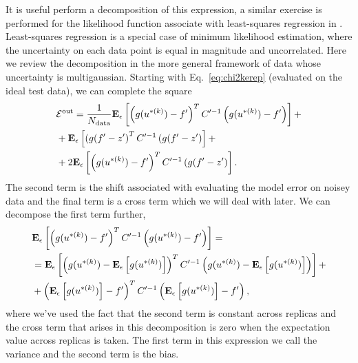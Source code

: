 It is useful perform a decomposition of this expression, a similar exercise
is performed for the likelihood function associate with least-squares
regression in \cite{mlforphysics}. Least-squares
regression is a special case of minimum likelihood estimation, where the
uncertainty on each data point is equal in magnitude and uncorrelated. Here
we review the decomposition in the more general framework of data whose
uncertainty is multigaussian. Starting with Eq.~\ref{eq:chi2kerep}
(evaluated on the ideal test data), we can
complete the square
\begin{equation}
    \begin{split}
        &\mathcal{E}^{\rm out} = \frac{1}{N_{\rm data}} \mathbf{E}_{\epsilon}\left[ 
            \left( g(u^{* (k)}) - f^\prime \right)^T
            C^{\prime -1}
            \left( g(u^{* (k)}) - f^\prime \right)
         \right] + \\
        &+ \mathbf{E}_{\epsilon}\left[ 
            \left( g(f^\prime - z^\prime \right)^T
            C^{\prime -1}
            \left( g(f^\prime - z^\prime \right)
         \right]+ \\
        &+ 2 \mathbf{E}_{\epsilon}\left[ 
            \left( g(u^{* (k)}) - f^\prime \right)^T
            C^{\prime -1}
            \left( g(f^\prime - z^\prime \right)
         \right].
    \end{split}
\end{equation}
The second term is the shift associated with evaluating the model error on noisey
data and the final term is a cross term which we will deal with later. We can
decompose the first term further,
\begin{equation}
    \begin{split}
        &\mathbf{E}_{\epsilon}\left[ 
            \left( g(u^{* (k)}) - f^\prime \right)^T
            C^{\prime -1}
            \left( g(u^{* (k)}) - f^\prime \right)
         \right] = \\
        &= \mathbf{E}_{\epsilon}\left[ 
            \left( g(u^{* (k)}) - \mathbf{E}_{\epsilon}\left[ g(u^{* (k)}) \right] \right)^T
            C^{\prime -1}
            \left( g(u^{* (k)}) - \mathbf{E}_{\epsilon}\left[ g(u^{* (k)}) \right] \right)
         \right] + \\
        &+ \left( \mathbf{E}_{\epsilon}\left[ g(u^{* (k)}) \right] - f^\prime \right)^T
        C^{\prime -1}
        \left( \mathbf{E}_{\epsilon}\left[ g(u^{* (k)}) \right] - f^\prime \right),
    \end{split}
\end{equation}
where we've used the fact that the second term is constant across replicas
and the cross term that arises in this decomposition is zero when the expectation
value across replicas is taken. The first term in this expression we call the
variance and the second term is the bias.

